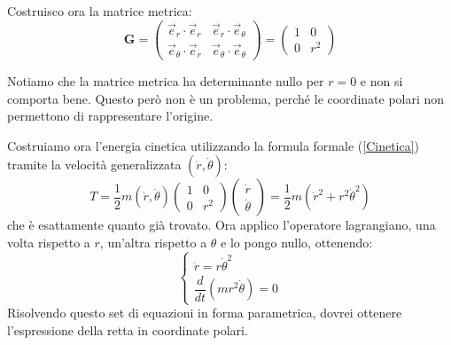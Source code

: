 \documentclass[a4paper,openany]{article}
\begin{document}
	Costruisco ora la matrice metrica:
	\begin{equation}
		\textbf{G} =
		\begin{pmatrix}
			\vec{e}_{r}\cdot\vec{e}_{r} & \vec{e}_{r}\cdot\vec{e}_{\theta} \\
			\vec{e}_{\theta}\cdot\vec{e}_{r} & \vec{e}_{\theta}\cdot\vec{e}_{\theta}
		\end{pmatrix} =
		\begin{pmatrix}
			1 & 0 \\
			0 & r^{2}
		\end{pmatrix}
	\end{equation}
	
	Notiamo che la matrice metrica ha determinante nullo per $r=0$ e non si comporta bene. Questo però non è un problema, perché le coordinate polari non permettono di rappresentare l'origine.
	
	Costruiamo ora l'energia cinetica utilizzando la formula formale (\ref{Cinetica}) tramite la velocità generalizzata $(\dot{r},\dot{\theta})$:
	\begin{equation}
		T = \dfrac{1}{2}m (\dot{r},\dot{\theta})
		\begin{pmatrix}
			1 & 0 \\
			0 & r^{2}
		\end{pmatrix}
		\begin{pmatrix}
			\dot{r} \\ \dot{\theta}
		\end{pmatrix} =
		\dfrac{1}{2}m(\dot{r}^{2}+r^{2}\dot{\theta}^{2})
	\end{equation}
	che è esattamente quanto già trovato. Ora applico l'operatore lagrangiano, una volta rispetto a $r$, un'altra rispetto a $\theta$ e lo pongo nullo, ottenendo:
	\begin{equation}
		\begin{cases}
			\ddot{r} = r\dot{\theta}^{2} \\
			\dfrac{d}{dt}(mr^{2}\dot{\theta}) =0
		\end{cases}
		\label{LiberoPolari}
	\end{equation}
	Risolvendo questo set di equazioni in forma parametrica, dovrei ottenere l'espressione della retta in coordinate polari.
\end{document}
